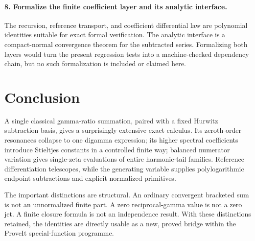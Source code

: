 \paragraph{8. Formalize the finite coefficient layer and its analytic interface.}
The recursion, reference transport, and coefficient differential law are
polynomial identities suitable for exact formal verification.  The
analytic interface is a compact-normal convergence theorem for the
subtracted series.  Formalizing both layers would turn the present
regression tests into a machine-checked dependency chain, but no such
formalization is included or claimed here.

\section{Conclusion}
A single classical gamma-ratio summation, paired with a fixed Hurwitz
subtraction basis, gives a surprisingly extensive exact calculus.
Its zeroth-order resonances collapse to one digamma expression; its
higher spectral coefficients introduce Stieltjes constants in a controlled
finite way; balanced numerator variation gives single-zeta evaluations
of entire harmonic-tail families.  Reference differentiation telescopes,
while the generating variable supplies polylogarithmic endpoint
subtractions and explicit normalized primitives.

The important distinctions are structural.  An ordinary convergent
bracketed sum is not an unnormalized finite part.  A zero reciprocal-gamma
value is not a zero jet.  A finite closure formula is not an independence
result.  With these distinctions retained, the identities are directly
usable as a new, proved bridge within the ProveIt special-function
programme.
